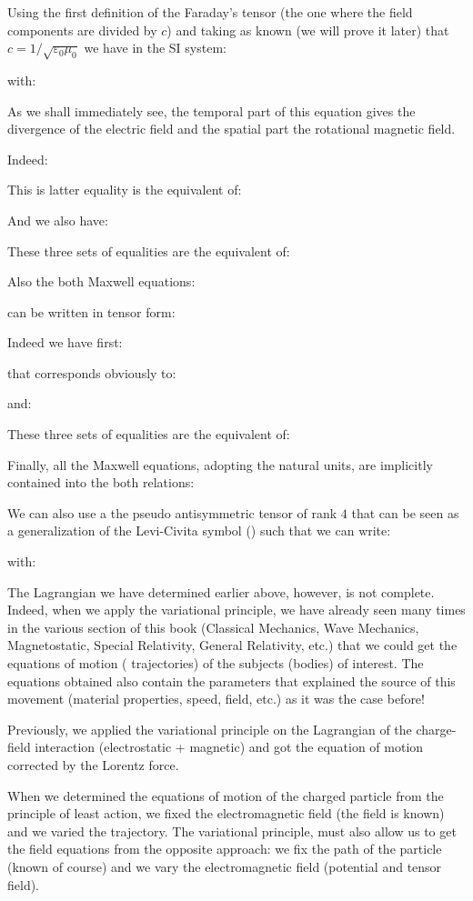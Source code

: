 	Using the first definition of the Faraday's tensor (the one where the field components are divided by $c$) and taking as known (we will prove it later) that $c=1/\sqrt{\varepsilon_0\mu_0}$ we have in the SI system:
	
	with:
	
	As we shall immediately see, the temporal part of this equation gives the divergence of the electric field and the spatial part the rotational magnetic field.
	
	Indeed:
	
	This is latter equality is the equivalent of:
	
	And we also have:
	
	These three sets of equalities are the equivalent of:
	
	Also the both Maxwell equations:
	
	can be written in tensor form:
	
	Indeed we have first:
	
	that corresponds obviously to:
	
	and:
	
	These three sets of equalities are the equivalent of:
	
	Finally, all the Maxwell equations, adopting the natural units, are implicitly contained into the both relations:
	
	We can also use a the pseudo antisymmetric tensor of rank $4$ that can be seen as a generalization of the Levi-Civita symbol () such that we can write:
	
	with:
	
	The Lagrangian we have determined earlier above, however, is not complete. Indeed, when we apply the variational principle, we have already seen many times in the various section of this book (Classical Mechanics, Wave  Mechanics, Magnetostatic, Special Relativity, General Relativity, etc.) that we could get the equations of motion ( trajectories) of the subjects (bodies) of interest. The equations obtained also contain the parameters that explained the source of this movement (material properties, speed, field, etc.) as it was the case before!

	Previously, we applied the variational principle on the Lagrangian of the charge-field interaction (electrostatic + magnetic) and got the equation of motion corrected by the Lorentz force.

	When we determined the equations of motion of the charged particle from the principle of least action, we fixed the electromagnetic field (the field is known) and we varied the trajectory. The variational principle, must also allow us to get the field equations from the opposite approach: we fix the path of the particle (known of course) and we vary the electromagnetic field (potential and tensor field).

